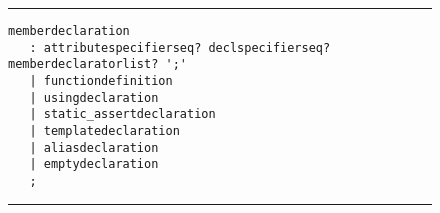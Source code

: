 \begin{figure}[H]
\noindent\rule{\textwidth}{1pt}
\begin{lstlisting}[language=AntlrGrammar, caption={A rule from CPP14.g4 \cite{git:cpp14_g4} from the ANTLR grammar \gls{git} repository}, label={lst:antlrCppGrammarRuleExample}]
memberdeclaration
   : attributespecifierseq? declspecifierseq? memberdeclaratorlist? ';'
   | functiondefinition
   | usingdeclaration
   | static_assertdeclaration
   | templatedeclaration
   | aliasdeclaration
   | emptydeclaration
   ;
\end{lstlisting}
\noindent\rule{\textwidth}{1pt}
\end{figure}